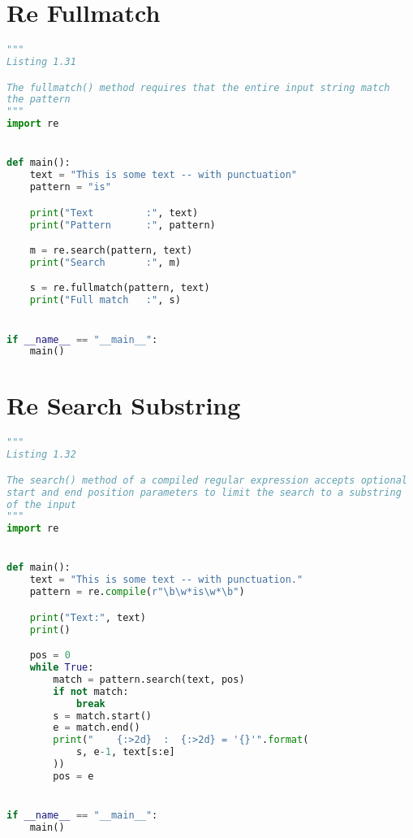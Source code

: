 \documentclass[a4paper,landscape]{report}
\begin{document}
\section{Re Fullmatch}
\begin{lstlisting}[language=Python]
"""
Listing 1.31

The fullmatch() method requires that the entire input string match
the pattern
"""
import re


def main():
    text = "This is some text -- with punctuation"
    pattern = "is"

    print("Text         :", text)
    print("Pattern      :", pattern)

    m = re.search(pattern, text)
    print("Search       :", m)

    s = re.fullmatch(pattern, text)
    print("Full match   :", s)


if __name__ == "__main__":
    main()

\end{lstlisting}
\section{Re Search Substring}
\begin{lstlisting}[language=Python]
"""
Listing 1.32

The search() method of a compiled regular expression accepts optional
start and end position parameters to limit the search to a substring
of the input
"""
import re


def main():
    text = "This is some text -- with punctuation."
    pattern = re.compile(r"\b\w*is\w*\b")

    print("Text:", text)
    print()

    pos = 0
    while True:
        match = pattern.search(text, pos)
        if not match:
            break
        s = match.start()
        e = match.end()
        print("    {:>2d}  :  {:>2d} = '{}'".format(
            s, e-1, text[s:e]
        ))
        pos = e


if __name__ == "__main__":
    main()

\end{lstlisting}
\end{document}

